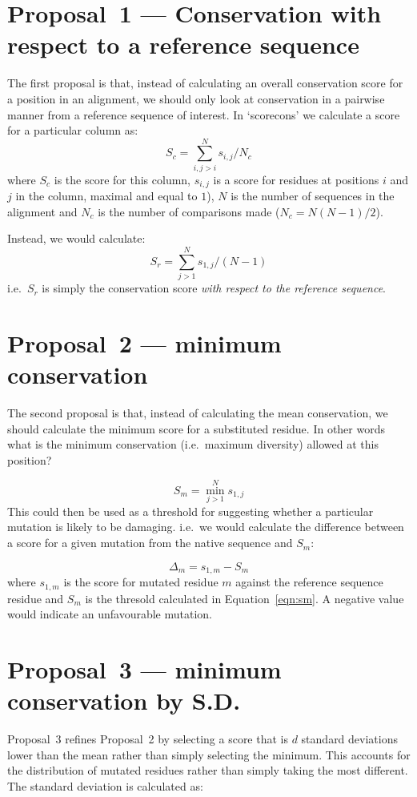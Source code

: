 \documentclass[a4paper]{article}
\begin{document}
\section{Proposal~1 --- Conservation with respect to a reference
  sequence} 
The first proposal is that, instead of calculating an overall
conservation score for a position in an alignment, we should only
look at conservation in a pairwise manner from a reference sequence of
interest. In `scorecons' we calculate a score for a particular column as:
\begin{equation}
  S_c = \sum_{i, j>i}^Ns_{i, j} / N_c
\end{equation}
where $S_c$ is the score for this column, $s_{i,j}$ is a score for
residues at positions $i$ and $j$ in the column, maximal and
equal to $1$), $N$ is the number of sequences in the alignment and
$N_c$ is the number of comparisons made ($N_c = N(N-1)/2$).

Instead, we would calculate:
\begin{equation}\label{eqn:sr}
  S_{r} = \sum_{j>1}^Ns_{1, j} / (N-1)
\end{equation}
i.e.\ $S_r$ is simply the conservation score \emph{with respect to
  the reference sequence}.

\section{Proposal~2 --- minimum conservation}
The second proposal is that, instead of calculating the mean
conservation, we should calculate the minimum score for a substituted
residue. In other words what is the minimum conservation (i.e.\
maximum diversity) allowed at this position?

\begin{equation} \label{eqn:sm}
  S_{m} = \min_{j>1}^Ns_{1, j}
\end{equation}
This could then be used as a threshold for suggesting whether a
particular mutation is likely to be damaging. i.e.\ we would calculate
the difference between a score for a given mutation from the native
sequence and $S_m$:

\begin{equation}
  \Delta_m = s_{1, m} - S_m
\end{equation}
where $s_{1,m}$ is the score for mutated residue $m$ against the
reference sequence residue and $S_m$ is the thresold calculated in
Equation~\ref{eqn:sm}. A negative value would indicate an unfavourable
mutation. 

\section{Proposal~3 --- minimum conservation by S.D.}
Proposal~3 refines Proposal~2 by selecting a score that is $d$
standard deviations lower than the mean rather than simply selecting
the minimum. This accounts for the distribution of mutated residues
rather than simply taking the most different. The standard deviation
is calculated as:
\end{document}
